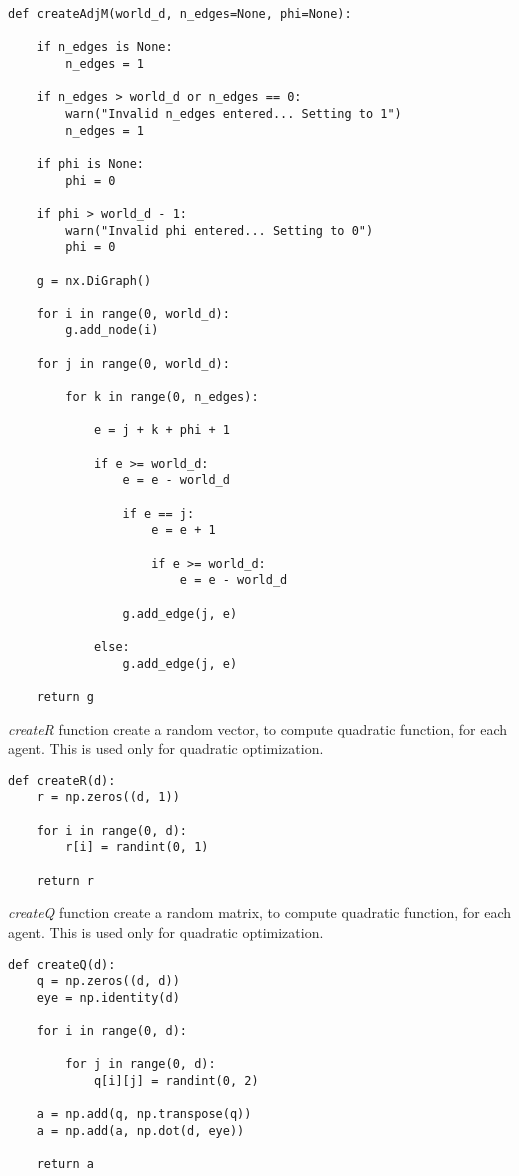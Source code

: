 \documentclass[a4paper,11pt,oneside]{book}
\begin{document}
\begin{lstlisting}
def createAdjM(world_d, n_edges=None, phi=None):

    if n_edges is None:
        n_edges = 1

    if n_edges > world_d or n_edges == 0:
        warn("Invalid n_edges entered... Setting to 1")
        n_edges = 1

    if phi is None:
        phi = 0

    if phi > world_d - 1:
        warn("Invalid phi entered... Setting to 0")
        phi = 0

    g = nx.DiGraph()

    for i in range(0, world_d):
        g.add_node(i)

    for j in range(0, world_d):

        for k in range(0, n_edges):

            e = j + k + phi + 1

            if e >= world_d:
                e = e - world_d

                if e == j:
                    e = e + 1

                    if e >= world_d:
                        e = e - world_d

                g.add_edge(j, e)

            else:
                g.add_edge(j, e)

    return g
\end{lstlisting}

\textit{createR} function create a random vector, to compute quadratic function, for each agent. This is used only for quadratic optimization.

\begin{lstlisting}
def createR(d):
    r = np.zeros((d, 1))

    for i in range(0, d):
        r[i] = randint(0, 1)

    return r
\end{lstlisting}

\textit{createQ} function create a random matrix, to compute quadratic function, for each agent. This is used only for quadratic optimization.

\begin{lstlisting}
def createQ(d):
    q = np.zeros((d, d))
    eye = np.identity(d)

    for i in range(0, d):

        for j in range(0, d):
            q[i][j] = randint(0, 2)

    a = np.add(q, np.transpose(q))
    a = np.add(a, np.dot(d, eye))

    return a
\end{lstlisting}
\end{document}
